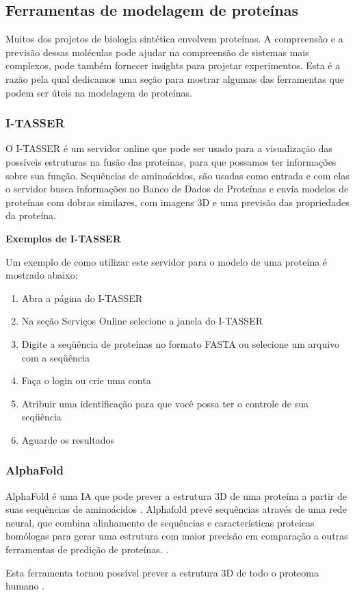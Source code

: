 \documentclass[11pt, letterpaper, portuguese]{article}
\begin{document}
     \subsection{Ferramentas de modelagem de proteínas}
    
   Muitos dos projetos de biologia sintética envolvem proteínas. A compreensão e a previsão dessas moléculas pode ajudar na compreensão de sistemas mais complexos, pode também fornecer insights para projetar experimentos. Esta é a razão pela qual dedicamos uma seção para mostrar algumas das ferramentas que podem ser úteis na modelagem de proteínas.
        \subsubsection{I-TASSER}
        \par{O I-TASSER é um servidor online que pode ser usado para a visualização das possíveis estruturas na fusão das proteínas, para que possamos ter informações sobre sua função. Sequências de aminoácidos, são usadas como entrada e com elas o servidor busca informações no Banco de Dados de Proteínas e envia modelos de proteínas com dobras similares, com imagens 3D e uma previsão das propriedades da proteína. }\\
        \par{\textbf{Exemplos de I-TASSER}}
        \par{Um exemplo de como utilizar este servidor para o modelo de uma proteína é mostrado abaixo:}
            \begin{enumerate}[1.]
            \item Abra a página do I-TASSER
            \item Na seção Serviços Online selecione a janela do I-TASSER
            \item Digite a seqüência de proteínas no formato FASTA ou selecione um arquivo com a seqüência
            \item Faça o login ou crie uma conta
            \item Atribuir uma identificação para que você possa ter o controle de sua seqüência
            \item Aguarde os resultados

            \end{enumerate}
        \subsubsection{AlphaFold}
            \par{AlphaFold é uma IA que pode prever a estrutura 3D de uma proteína a partir de suas sequências de aminoácidos \cite{Kiersten}. Alphafold prevê sequências através de uma rede neural, que combina alinhamento de sequências e características proteicas homólogas para gerar uma estrutura com maior precisão em comparação a outras ferramentas de predição de proteínas. \cite{DAVID}.}
            \par{Esta ferramenta tornou possível prever a estrutura 3D de todo o proteoma humano \cite{DAVID}.}
\end{document}
